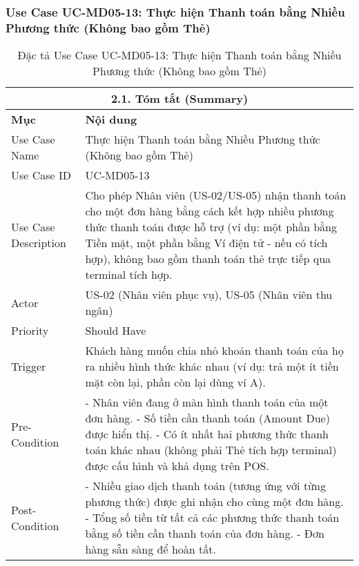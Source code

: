\subsubsection{Use Case UC-MD05-13: Thực hiện Thanh toán bằng Nhiều Phương thức (Không bao gồm Thẻ)}
\begin{longtable}{|m{4cm}|p{11cm}|}
\caption{Đặc tả Use Case UC-MD05-13: Thực hiện Thanh toán bằng Nhiều Phương thức (Không bao gồm Thẻ)} \label{tab:uc_md05_13_final} \\
\hline
\multicolumn{2}{|c|}{\textbf{2.1. Tóm tắt (Summary)}} \\
\hline
\textbf{Mục} & \textbf{Nội dung} \\
\hline
\endhead %
\hline
\endfoot %
\hline
\endlastfoot %
Use Case Name & Thực hiện Thanh toán bằng Nhiều Phương thức (Không bao gồm Thẻ) \\
\hline
Use Case ID & UC-MD05-13 \\
\hline
Use Case Description & Cho phép Nhân viên (US-02/US-05) nhận thanh toán cho một đơn hàng bằng cách kết hợp nhiều phương thức thanh toán được hỗ trợ (ví dụ: một phần bằng Tiền mặt, một phần bằng Ví điện tử - nếu có tích hợp), không bao gồm thanh toán thẻ trực tiếp qua terminal tích hợp. \\
\hline
Actor & US-02 (Nhân viên phục vụ), US-05 (Nhân viên thu ngân) \\
\hline
Priority & Should Have \\
\hline
Trigger & Khách hàng muốn chia nhỏ khoản thanh toán của họ ra nhiều hình thức khác nhau (ví dụ: trả một ít tiền mặt còn lại, phần còn lại dùng ví A). \\
\hline
Pre-Condition & - Nhân viên đang ở màn hình thanh toán của một đơn hàng. \newline - Số tiền cần thanh toán (Amount Due) được hiển thị. \newline - Có ít nhất hai phương thức thanh toán khác nhau (không phải Thẻ tích hợp terminal) được cấu hình và khả dụng trên POS. \\
\hline
Post-Condition & - Nhiều giao dịch thanh toán (tương ứng với từng phương thức) được ghi nhận cho cùng một đơn hàng. \newline - Tổng số tiền từ tất cả các phương thức thanh toán bằng số tiền cần thanh toán của đơn hàng. \newline - Đơn hàng sẵn sàng để hoàn tất. \\
\hline

\end{longtable}
